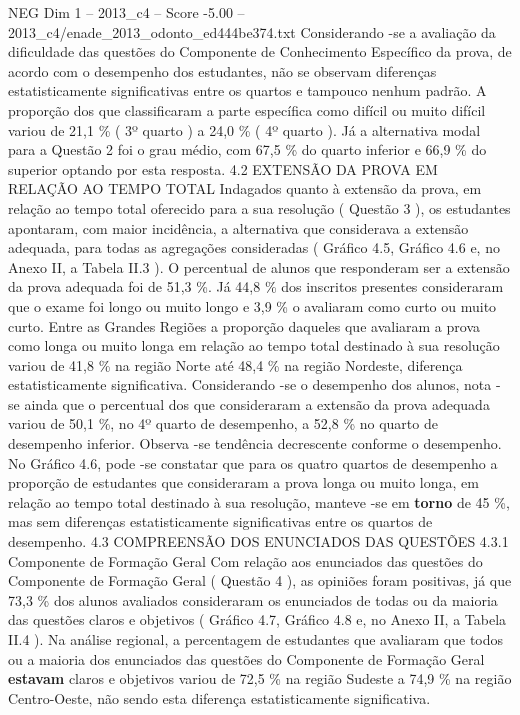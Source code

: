 \begin{textsample}{NEG Dim 1 – 2013\_c4 – Score -5.00 – 2013\_c4/enade\_2013\_odonto\_ed444be374.txt}
Considerando -se a avaliação da dificuldade das questões do Componente de Conhecimento Específico da prova, de acordo com o desempenho dos estudantes, não se observam diferenças estatisticamente significativas entre os quartos e tampouco nenhum padrão.
A proporção dos que classificaram a parte específica como difícil ou muito difícil variou de 21,1 \% ( 3º quarto ) a 24,0 \% ( 4º quarto ).
Já a alternativa modal para a Questão 2 foi o grau médio, com 67,5 \% do quarto inferior e 66,9 \% do superior optando por esta resposta. 4.2 EXTENSÃO DA PROVA EM RELAÇÃO AO TEMPO TOTAL Indagados quanto à extensão da prova, em relação ao tempo total oferecido para a sua resolução ( Questão 3 ), os estudantes apontaram, com maior incidência, a alternativa que considerava a extensão adequada, para todas as agregações consideradas ( Gráfico 4.5, Gráfico 4.6 e, no Anexo II, a Tabela II.3 ).
O percentual de alunos que responderam ser a extensão da prova adequada foi de 51,3 \%.
Já 44,8 \% dos inscritos presentes consideraram que o exame foi longo ou muito longo e 3,9 \% o avaliaram como curto ou muito curto.
Entre as Grandes Regiões a proporção daqueles que avaliaram a prova como longa ou muito longa em relação ao tempo total destinado à sua resolução variou de 41,8 \% na região Norte até 48,4 \% na região Nordeste, diferença estatisticamente significativa.
Considerando -se o desempenho dos alunos, nota -se ainda que o percentual dos que consideraram a extensão da prova adequada variou de 50,1 \%, no 4º quarto de desempenho, a 52,8 \% no quarto de desempenho inferior.
Observa -se tendência decrescente conforme o desempenho.
No Gráfico 4.6, pode -se constatar que para os quatro quartos de desempenho a proporção de estudantes que consideraram a prova longa ou muito longa, em relação ao tempo total destinado à sua resolução, manteve -se em \textbf{torno} de 45 \%, mas sem diferenças estatisticamente significativas entre os quartos de desempenho. 4.3 COMPREENSÃO DOS ENUNCIADOS DAS QUESTÕES 4.3.1 Componente de Formação Geral Com relação aos enunciados das questões do Componente de Formação Geral ( Questão 4 ), as opiniões foram positivas, já que 73,3 \% dos alunos avaliados consideraram os enunciados de todas ou da maioria das questões claros e objetivos ( Gráfico 4.7, Gráfico 4.8 e, no Anexo II, a Tabela II.4 ).
Na análise regional, a percentagem de estudantes que avaliaram que todos ou a maioria dos enunciados das questões do Componente de Formação Geral \textbf{estavam} claros e objetivos variou de 72,5 \% na região Sudeste a 74,9 \% na região Centro-Oeste, não sendo esta diferença estatisticamente significativa.

\end{textsample}
